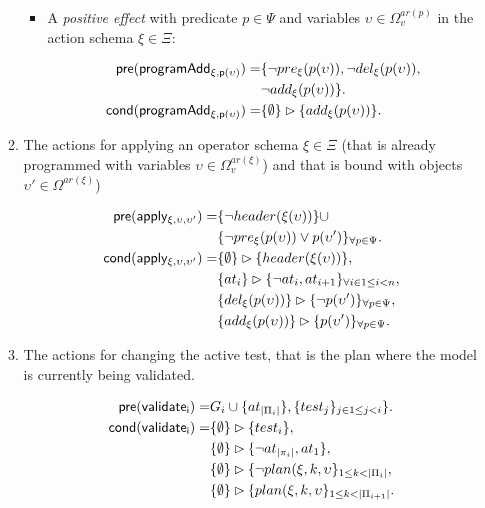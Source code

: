 \documentclass[letterpaper]{article} %
\newcommand{\pre}{\mathsf{pre}}     %
\newcommand{\cond}{\mathsf{cond}}   %
\begin{document}
\begin{itemize}
\begin{enumerate}
\begin{itemize}
\item A {\em positive effect} with predicate $p\in\Psi$ and variables $\upsilon\in\Omega_v^{ar(p)}$ in the action schema $\xi\in\Xi$:
\begin{small}
\begin{align*}
\hspace*{7pt}\pre(\mathsf{programAdd_{\xi,p(\upsilon)}})=&\{\neg pre_{\xi}(p(\upsilon)),\neg del_{\xi}(p(\upsilon)),\\
                                                     &\neg add_{\xi}(p(\upsilon))\}.\\                                                   
\cond(\mathsf{programAdd_{\xi,p(\upsilon)}})=&\{\emptyset\}\rhd\{add_{\xi}(p(\upsilon))\}.
\end{align*}
\end{small}
\end{itemize}

\item The actions for applying an operator schema $\xi\in\Xi$ (that is already programmed with variables $\upsilon\in\Omega_v^{ar(\xi)}$) and that is bound with objects $\upsilon'\in\Omega^{ar(\xi)}$)
\begin{small}
\begin{align*}
\hspace*{7pt}\pre(\mathsf{apply_{\xi,\upsilon,\upsilon'}})=&\{\neg header(\xi(\upsilon))\}\cup\\     
                                           &\{\neg pre_{\xi}(p(\upsilon))\vee p(\upsilon')\}_{\forall p\in\Psi}.\\
\cond(\mathsf{apply_{\xi,\upsilon,\upsilon'}})=&\{\emptyset\}\rhd\{header(\xi(\upsilon))\},\\
&\{at_{i}\}\rhd\{\neg at_{i},at_{i+1}\}_{\forall i\in 1\leq i< n},\\
&\{del_{\xi}(p(\upsilon))\}\rhd\{\neg p(\upsilon')\}_{\forall p\in\Psi},\\
&\{add_{\xi}(p(\upsilon))\}\rhd\{p(\upsilon')\}_{\forall p\in\Psi}.
\end{align*}
\end{small}

\item The actions for changing the active test, that is the plan where the model is currently being validated.
\begin{small}
\begin{align*}
\hspace*{7pt}\pre(\mathsf{validate_{i}})=&G_i\cup\{at_{|\Pi_i|}\},\{test_j\}_{j\in 1\leq j<i}\}.\\
\cond(\mathsf{validate_{i}})=&\{\emptyset\}\rhd\{test_i\},\\
&\{\emptyset\}\rhd\{\neg at_{|\pi_i|},at_1\},\\
&\{\emptyset\}\rhd\{\neg plan(\xi,k,\upsilon\}_{1\leq k<|\Pi_i|},\\
&\{\emptyset\}\rhd\{plan(\xi,k,\upsilon\}_{1\leq k<|\Pi_{i+1}|}.
\end{align*}
\end{small}
\end{enumerate}
\end{itemize}
\end{document}
